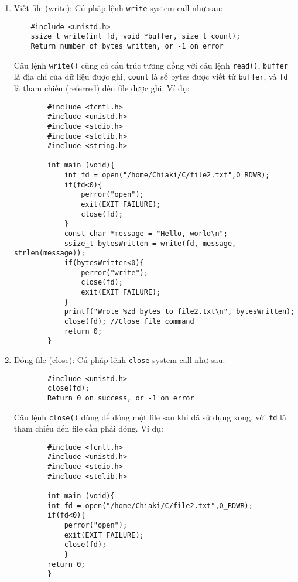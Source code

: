 \documentclass{article}
\begin{document}
\begin{enumerate}
\begin{verbatim}
    int main(void){
        int fd = open("/home/Chiaki/C/file2.txt",O_RDONLY);
        if(fd<0){
            perror("open");
            exit(EXIT_FAILURE);
            close(fd);
        }
        char buffer[50];
        ssize_t bytesRead = read(fd, buffer, sizeof(buffer)-1);
        if(bytesRead == -1){
            perror("read");
        }
        buffer[bytesRead] = '\0'; //Null-terminate the string
        printf("Read %zd bytes: %s\n",bytesRead,buffer);  
        return 0;
    }    
\end{verbatim}
    \item Viết file (write): Cú pháp lệnh \verb|write| system call như sau:
    \begin{verbatim}
    #include <unistd.h>
    ssize_t write(int fd, void *buffer, size_t count);
    Return number of bytes written, or -1 on error
    \end{verbatim}
    Câu lệnh \verb|write()| cũng có cấu trúc tương đồng với câu lệnh \verb|read()|, \verb|buffer| là địa chỉ của dữ liệu được ghi, \verb|count| là số bytes được viết từ \verb|buffer|, và \verb|fd| là tham chiếu (referred) đến file được ghi. Ví dụ:
    \begin{verbatim}
        #include <fcntl.h>
        #include <unistd.h>
        #include <stdio.h>
        #include <stdlib.h>
        #include <string.h>
        
        int main (void){
            int fd = open("/home/Chiaki/C/file2.txt",O_RDWR);
            if(fd<0){
                perror("open");
                exit(EXIT_FAILURE);
                close(fd);
            }
            const char *message = "Hello, world\n";
            ssize_t bytesWritten = write(fd, message, strlen(message));
            if(bytesWritten<0){
                perror("write");
                close(fd);
                exit(EXIT_FAILURE);
            }
            printf("Wrote %zd bytes to file2.txt\n", bytesWritten);
            close(fd); //Close file command
            return 0;
        }
    \end{verbatim}
    \item Đóng file (close): Cú pháp lệnh \verb|close| system call như sau:
    \begin{verbatim}
        #include <unistd.h>
        close(fd);
        Return 0 on success, or -1 on error
    \end{verbatim}
    Câu lệnh \verb|close()| dùng để đóng một file sau khi đã sử dụng xong, với \verb|fd| là tham chiếu đến file cần phải đóng. Ví dụ:
    \begin{verbatim}
        #include <fcntl.h>
        #include <unistd.h>
        #include <stdio.h>
        #include <stdlib.h>

        int main (void){
        int fd = open("/home/Chiaki/C/file2.txt",O_RDWR);
        if(fd<0){
            perror("open");
            exit(EXIT_FAILURE);
            close(fd);
            }
        return 0;
        }

    \end{verbatim}
\end{enumerate}
\end{document}
